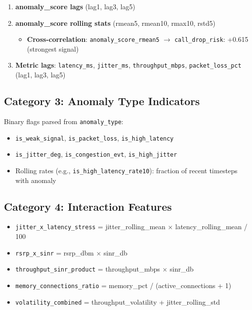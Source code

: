\documentclass[11pt,a4paper,oneside]{report}
\begin{document}
\begin{enumerate}
    \item \textbf{anomaly\_score lags} (lag1, lag3, lag5)
    \item \textbf{anomaly\_score rolling stats} (rmean5, rmean10, rmax10, rstd5)
        \begin{itemize}
            \item \textbf{Cross-correlation}: \texttt{anomaly\_score\_rmean5} $\rightarrow$ \texttt{call\_drop\_risk}: +0.615 (strongest signal)
        \end{itemize}
    \item \textbf{Metric lags}: \texttt{latency\_ms}, \texttt{jitter\_ms}, \texttt{throughput\_mbps}, \texttt{packet\_loss\_pct} (lag1, lag3, lag5)
\end{enumerate}

\subsection{Category 3: Anomaly Type Indicators}

Binary flags parsed from \texttt{anomaly\_type}:
\begin{itemize}
    \item \texttt{is\_weak\_signal}, \texttt{is\_packet\_loss}, \texttt{is\_high\_latency}
    \item \texttt{is\_jitter\_deg}, \texttt{is\_congestion\_evt}, \texttt{is\_high\_jitter}
    \item Rolling rates (e.g., \texttt{is\_high\_latency\_rate10}): fraction of recent timesteps with anomaly
\end{itemize}

\subsection{Category 4: Interaction Features}

\begin{itemize}
    \item \texttt{jitter\_x\_latency\_stress} = jitter\_rolling\_mean $\times$ latency\_rolling\_mean / 100
    \item \texttt{rsrp\_x\_sinr} = rsrp\_dbm $\times$ sinr\_db
    \item \texttt{throughput\_sinr\_product} = throughput\_mbps $\times$ sinr\_db
    \item \texttt{memory\_connections\_ratio} = memory\_pct / (active\_connections + 1)
    \item \texttt{volatility\_combined} = throughput\_volatility + jitter\_rolling\_std
\end{itemize}
\end{document}
